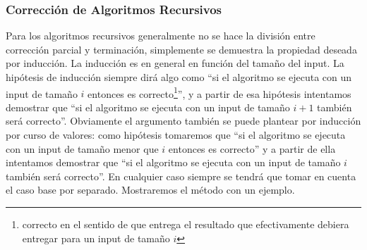 %
%

\subsubsection*{Corrección de Algoritmos Recursivos}
Para los algoritmos recursivos generalmente no se hace la división entre corrección parcial y terminación, simplemente se demuestra la propiedad deseada por inducción.
La inducción es en general en función del tamaño del input. 
La hipótesis de inducción siempre dirá algo como ``si el algoritmo se ejecuta con un input de tamaño $i$ entonces es correcto\footnote{correcto en el sentido de que entrega el resultado que efectivamente debiera entregar para un input de tamaño $i$}'', y a partir de esa hipótesis intentamos demostrar que ``si el algoritmo se ejecuta con un input de tamaño $i+1$ también será correcto''.
Obviamente el argumento también se puede plantear por inducción por curso de valores: como hipótesis tomaremos que ``si el algoritmo se ejecuta con un input de tamaño menor que $i$ entonces es correcto'' y a partir de ella intentamos demostrar que ``si el algoritmo se ejecuta con un input de tamaño $i$ también será correcto''.
En cualquier caso siempre se tendrá que tomar en cuenta el caso base por separado.
Mostraremos el método con un ejemplo.

